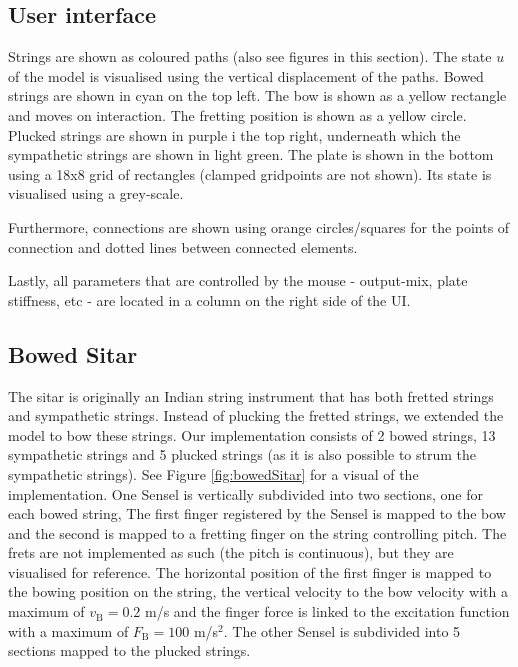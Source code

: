 \documentclass{article}
\begin{document}
\subsection{User interface}
Strings are shown as coloured paths (also see figures in this section). The state $u$ of the model is visualised using the vertical displacement of the paths. Bowed strings are shown in cyan on the top left. The bow is shown as a yellow rectangle and moves on interaction. The fretting position is shown as a yellow circle. Plucked strings are shown in purple i the top right, underneath which the sympathetic strings are shown in light green. The plate is shown in the bottom using a 18x8 grid of rectangles (clamped gridpoints are not shown). Its state is visualised using a grey-scale.

Furthermore, connections are shown using orange circles/squares for the points of connection and dotted lines between connected elements.

Lastly, all parameters that are controlled by the mouse - output-mix, plate stiffness, etc - are located in a column on the right side of the UI.

\subsection{Bowed Sitar}
The sitar is originally an Indian string instrument that has both fretted strings and sympathetic strings. Instead of plucking the fretted strings, we extended the model to bow these strings. Our implementation consists of 2 bowed strings, 13 sympathetic strings and 5 plucked strings (as it is also possible to strum the sympathetic strings). See Figure \ref{fig:bowedSitar} for a visual of the implementation. One Sensel is vertically subdivided into two sections, one for each bowed string, The first finger registered by the Sensel is mapped to the bow and the second is mapped to a fretting finger on the string controlling pitch. The frets are not implemented as such (the pitch is continuous), but they are visualised for reference. The horizontal position of the first finger is mapped to the bowing position on the string, the vertical velocity  to the bow velocity with a maximum of $v_\text{B} = 0.2$ m/s and the finger force is linked to the excitation function with a maximum of $F_\text{B} = 100$ m/s$^2$. The other Sensel is subdivided into 5 sections mapped to the plucked strings. 
\end{document}
